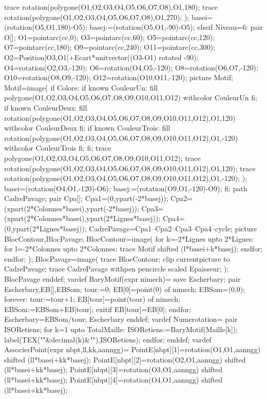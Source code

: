 {  trace rotation(polygone(O1,O2,O3,O4,O5,O6,O7,O8),O1,180);
  trace rotation(polygone(O1,O2,O3,O4,O5,O6,O7,O8),O1,270);
  );
  basei=(rotation(O5,O1,180)-O5);
  basej:=(rotation(O5,O1,-90)-O5);
  elseif Niveau=6:
  pair O[];
  O1=pointarc(cc,0);
  O3=pointarc(cc,60);
  O5=pointarc(cc,120);
  O7=pointarc(cc,180);
  O9=pointarc(cc,240);
  O11=pointarc(cc,300);
  O2=Position[O3,O1]+Ecart*unitvector((O3-O1) rotated -90);
  O4=rotation(O2,O3,-120);
  O6=rotation(O4,O5,-120);
  O8=rotation(O6,O7,-120);
  O10=rotation(O8,O9,-120);
  O12=rotation(O10,O11,-120);
  picture Motif;
  Motif=image(
  if Colore:
  if known CouleurUn: fill polygone(O1,O2,O3,O4,O5,O6,O7,O8,O9,O10,O11,O12) withcolor CouleurUn fi;
  if known CouleurDeux: fill rotation(polygone(O1,O2,O3,O4,O5,O6,O7,O8,O9,O10,O11,O12),O1,120) withcolor CouleurDeux fi;
  if known CouleurTrois: fill rotation(polygone(O1,O2,O3,O4,O5,O6,O7,O8,O9,O10,O11,O12),O1,-120) withcolor CouleurTrois fi;
  fi;
  trace polygone(O1,O2,O3,O4,O5,O6,O7,O8,O9,O10,O11,O12);
  trace rotation(polygone(O1,O2,O3,O4,O5,O6,O7,O8,O9,O10,O11,O12),O1,120);
  trace rotation(polygone(O1,O2,O3,O4,O5,O6,O7,O8,O9,O10,O11,O12),O1,-120);
  );
  basei=(rotation(O4,O1,-120)-O6);
  basej:=(rotation(O9,O1,-120)-O9);
  fi;
  path CadrePavage;
  pair Cpa[];
  Cpa1=(0,ypart(-2*basej));
  Cpa2=(xpart(2*Colonnes*basei),ypart(-2*basej));
  Cpa3=(xpart(2*Colonnes*basei),ypart(2*Lignes*basej));
  Cpa4=(0,ypart(2*Lignes*basej));
  CadrePavage=Cpa1--Cpa2--Cpa3--Cpa4--cycle;
  picture BlocContour,BlocPavage;
  BlocContour=image(
  for k=-2*Lignes upto 2*Lignes:
  for l=-2*Colonnes upto 2*Colonnes:
  trace Motif shifted (l*basei+k*basej);
  endfor;
  endfor;
  );
  BlocPavage=image(
  trace BlocContour;
  clip currentpicture to CadrePavage;
  trace CadrePavage withpen pencircle scaled Epaisseur;
  );
  BlocPavage
  enddef;
  vardef BaryMotif(expr nimech)=
  save Escherbary;
  pair Escherbary,EB[],EBSom;
  tour:=0;
  EB[0]=point(0) of nimech;
  EBSom=(0,0);
  forever:
  tour:=tour+1;
  EB[tour]=point(tour) of nimech;
  EBSom:=EBSom+EB[tour];
  exitif EB[tour]=EB[0];
  endfor;
  Escherbary=EBSom/tour;
  Escherbary
  enddef;
  vardef Numerotation=
  pair ISORetiens;
  for k=1 upto TotalMaille:
  ISORetiens:=BaryMotif(Maille[k]);
  label(TEX(""&decimal(k)&""),ISORetiens);
  endfor;
  enddef;
  vardef AssocierPoint(expr nbpt,ll,kk,aanngg)=
  PointE[nbpt][1]=rotation(O1,O1,aanngg) shifted (ll*basei+kk*basej);
  PointE[nbpt][2]=rotation(O2,O1,aanngg) shifted (ll*basei+kk*basej);
  PointE[nbpt][3]=rotation(O3,O1,aanngg) shifted (ll*basei+kk*basej);
  PointE[nbpt][4]=rotation(O4,O1,aanngg) shifted (ll*basei+kk*basej);
}

